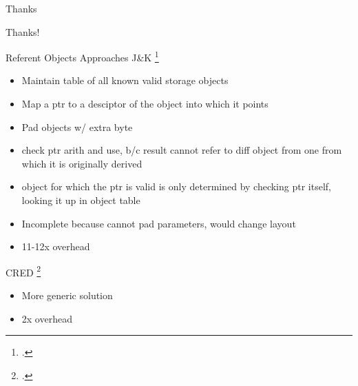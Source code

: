 \documentclass[aspectratio=169]{beamer}
\begin{document}
\begin{frame}{Thanks}
    \begin{center}
        \Huge{Thanks!}
    \end{center}
\end{frame}


\begin{frame}{Referent Objects Approaches}
J\&K \footcite{jones_backwards_1997}
    \begin{itemize}
       \item Maintain table of all known valid storage objects
       \item Map a ptr to a desciptor of the object into which it points
       \item Pad objects w/ extra byte
       \item check ptr arith and use, b/c result cannot refer to diff object from one from which it is originally derived
       \item object for which the ptr is valid is only determined by checking ptr itself, looking it up in object table
       \item Incomplete because cannot pad parameters, would change layout
       \item 11-12x overhead
    \end{itemize}

CRED \footcite{ruwase_practical_2004}
    \begin{itemize}
      \item More generic solution
      \item 2x overhead
    \end{itemize}
\vspace{0.2in}
\end{frame}
\end{document}
